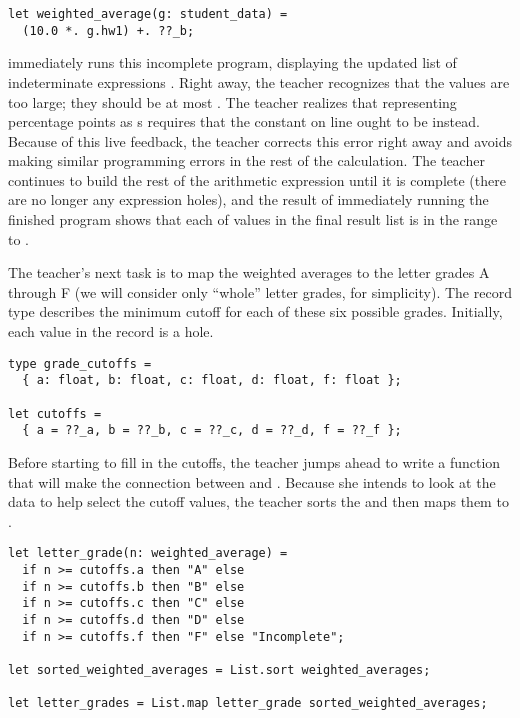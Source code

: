 \begin{lstlisting}
let weighted_average(g: student_data) =
  (10.0 *. g.hw1) +. ??_b;
\end{lstlisting}

\noindent
%
\HazelnutLive{} immediately runs this incomplete program, displaying the updated
list of indeterminate expressions \li{[760.0 + ??_b.1, 880.0 + ??_b.2, ...]}.
%
Right away, the teacher recognizes that the values are too large; they should be
at most .
%
The teacher realizes that representing percentage points as s requires
that the constant on line  ought to be  instead.
%
Because of this live feedback, the teacher corrects this error right away and
avoids making similar programming errors in the rest of the calculation.
%
The teacher continues to build the rest of the arithmetic expression until it is
complete (there are no longer any expression holes), and the result of
immediately running the finished program shows that each of values in the final
result list is in the range  to .

%
The teacher's next task is to map the weighted averages to the letter grades A
through F (we will consider only ``whole'' letter grades, for simplicity).
%
The  record type describes the minimum cutoff for each of
these six possible grades.
%
Initially, each value in the  record is a hole.

\begin{lstlisting}
type grade_cutoffs =
  { a: float, b: float, c: float, d: float, f: float };

let cutoffs =
  { a = ??_a, b = ??_b, c = ??_c, d = ??_d, f = ??_f };
\end{lstlisting}

\noindent
%
%
Before starting to fill in the cutoffs, the teacher jumps ahead to write a
function  that will make the connection between 
and .
%
Because she intends to look at the data to help select the cutoff values, the
teacher sorts the  and then maps them to
.

\begin{lstlisting}
let letter_grade(n: weighted_average) =
  if n >= cutoffs.a then "A" else
  if n >= cutoffs.b then "B" else
  if n >= cutoffs.c then "C" else
  if n >= cutoffs.d then "D" else
  if n >= cutoffs.f then "F" else "Incomplete";

let sorted_weighted_averages = List.sort weighted_averages;

let letter_grades = List.map letter_grade sorted_weighted_averages;
\end{lstlisting}

